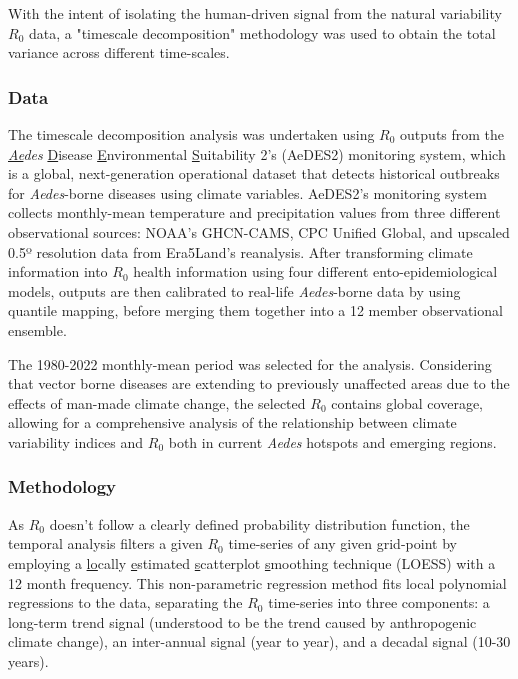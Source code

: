 \documentclass[fleqn,10pt]{wlscirep}
\begin{document}
  With the intent of isolating the human-driven signal from the natural variability $R_0$ data, a "timescale decomposition" methodology was used to obtain the total variance across different time-scales. 

  \subsubsection{Data} \label{sec-methods-1-data}
  The timescale decomposition analysis was undertaken using $R_0$ outputs from the \textit{\underline{Ae}des} \underline{D}isease \underline{E}nvironmental \underline{S}uitability 2's (AeDES2) monitoring system, which is a global, next-generation operational dataset that detects historical outbreaks for \textit{Aedes}-borne diseases using climate variables. AeDES2's monitoring system collects monthly-mean temperature and precipitation values from three different observational sources: NOAA's GHCN-CAMS, CPC Unified Global, and upscaled 0.5º resolution data from Era5Land's reanalysis. After transforming climate information into $R_0$ health information using four different ento-epidemiological models, outputs are then calibrated to real-life \textit{Aedes}-borne data by using quantile mapping, before merging them together into a 12 member observational ensemble.

  The 1980-2022 monthly-mean period was selected for the analysis. Considering that vector borne diseases are extending to previously unaffected areas due to the effects of man-made climate change, the selected $R_0$ contains global coverage, allowing for a comprehensive analysis of the relationship between climate variability indices and $R_0$ both in current \textit{Aedes} hotspots and emerging regions.

  \subsubsection{Methodology} \label{sec-methods-1-methodology}

  As $R_0$ doesn't follow a clearly defined probability distribution function, the temporal analysis filters a given $R_0$ time-series of any given grid-point by employing a \underline{lo}cally \underline{e}stimated \underline{s}catterplot \underline{s}moothing technique (LOESS) with a 12 month frequency. This non-parametric regression method fits local polynomial regressions to the data, separating the $R_0$ time-series into three components: a long-term trend signal (understood to be the trend caused by anthropogenic climate change), an inter-annual signal (year to year), and a decadal signal (10-30 years). 
\end{document}
